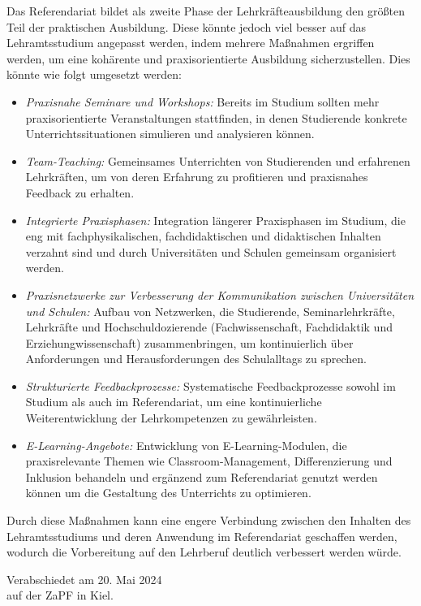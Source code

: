 \documentclass[DIV=calc]{scrartcl}
\begin{document}
Das Referendariat bildet als zweite Phase der Lehrkräfteausbildung den größten Teil der praktischen Ausbildung. Diese könnte jedoch viel besser auf das Lehramtsstudium angepasst werden, indem mehrere Maßnahmen ergriffen werden, um eine kohärente und praxisorientierte Ausbildung sicherzustellen. Dies könnte wie folgt umgesetzt werden:
\begin{itemize}
    \item \textit{Praxisnahe Seminare und Workshops:} Bereits im Studium sollten mehr praxisorientierte Veranstaltungen stattfinden, in denen Studierende konkrete Unterrichtssituationen simulieren und analysieren können.
    \item \textit{Team-Teaching:} Gemeinsames Unterrichten von Studierenden und erfahrenen Lehrkräften, um von deren Erfahrung zu profitieren und praxisnahes Feedback zu erhalten.
    \item \textit{Integrierte Praxisphasen:} Integration längerer Praxisphasen im Studium, die eng mit fachphysikalischen, fachdidaktischen und didaktischen Inhalten verzahnt sind und durch Universitäten und Schulen gemeinsam organisiert werden.
    \item \textit{Praxisnetzwerke zur Verbesserung der Kommunikation zwischen Universitäten und Schulen:} Aufbau von Netzwerken, die Studierende, Seminarlehrkräfte, Lehrkräfte und Hochschuldozierende (Fachwissenschaft, Fachdidaktik und Erziehungwissenschaft) zusammenbringen, um kontinuierlich über Anforderungen und Herausforderungen des Schulalltags zu sprechen.
    \item \textit{Strukturierte Feedbackprozesse:} Systematische Feedbackprozesse sowohl im Studium als auch im Referendariat, um eine kontinuierliche Weiterentwicklung der Lehrkompetenzen zu gewährleisten.
    \item \textit{E-Learning-Angebote:} Entwicklung von E-Learning-Modulen, die praxisrelevante Themen wie Classroom-Management, Differenzierung und Inklusion behandeln und ergänzend zum Referendariat genutzt werden können um die Gestaltung des Unterrichts zu optimieren.
\end{itemize}
Durch diese Maßnahmen kann eine engere Verbindung zwischen den Inhalten des Lehramtsstudiums und deren Anwendung im Referendariat geschaffen werden, wodurch die Vorbereitung auf den Lehrberuf deutlich verbessert werden würde. 

\theendnotes


%
\vfill
\begin{flushright}
	Verabschiedet am 20. Mai 2024 \\
	auf der ZaPF in Kiel.
\end{flushright}
\end{document}
